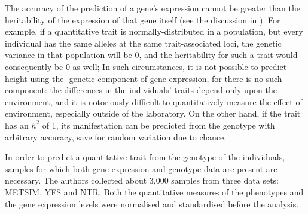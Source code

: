 \documentclass[../main.tex]{subfiles}
\begin{document}
The accuracy of the prediction of a gene's expression cannot be greater 
than the heritability of the expression of that gene itself (see the 
discussion in ). For example, if a quantitative 
trait is normally-distributed in a population, but every individual has 
the same alleles at the same trait-associated loci, the genetic variance 
in that population will be 0, and the heritability for such a trait 
would consequently be 0 as well; In such circumstances, it is not 
possible to predict height using the \cis-genetic component of gene 
expression, for there is no such component: the differences in the 
individuals' traits depend only upon the environment, and it is 
notoriously difficult to quantitatively measure the effect of 
environment, especially outside of the laboratory. On the other hand, if 
the trait has an $h^2$ of 1, its manifestation can be predicted from the 
genotype with arbitrary accuracy, save for random variation due to 
chance.

In order to predict a quantitative trait from the genotype of the 
individuals, samples for which both gene expression and genotype data 
are present are necessary. The authors collected about 3,000 samples 
from three data sets: METSIM, YFS and NTR. Both the quantitative 
measures of the phenotypes and the gene expression levels were 
normalised and standardised before the analysis.

\end{document}
